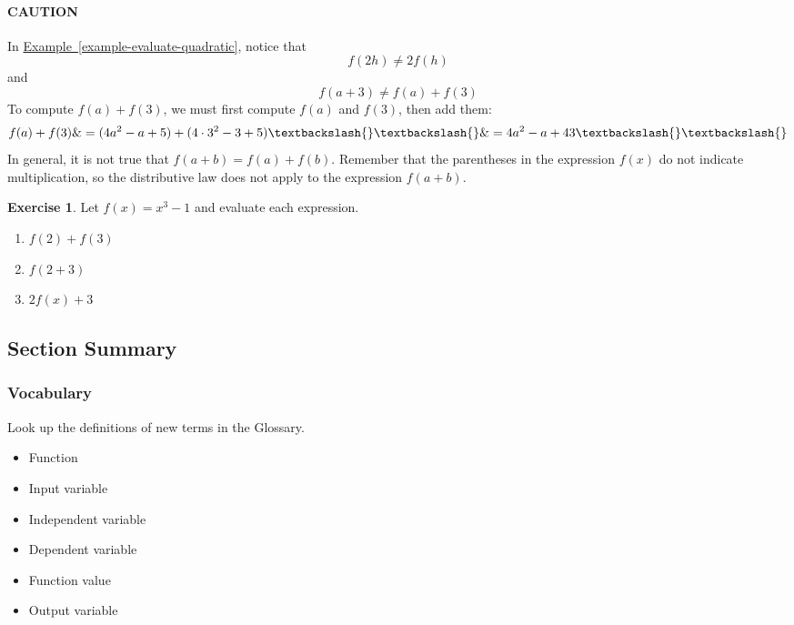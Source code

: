 \documentclass[10pt,]{book}
\theoremstyle{plain}
\theoremstyle{definition}
\theoremstyle{definition}
\theoremstyle{definition}
\theoremstyle{definition}
\newtheorem{exercise}[theorem]{Exercise}
\numberwithin{equation}{part}
\begin{document}
\paragraph[{CAUTION}]{CAUTION}\hypertarget{paragraphs-2}{}
In \hyperref[example-evaluate-quadratic]{Example~\ref{example-evaluate-quadratic}}, notice that%
\begin{equation*}
f(2h) \ne 2 f(h)
\end{equation*}
and%
\begin{equation*}
f(a + 3) \ne f(a) + f(3)
\end{equation*}
To compute \(f(a) + f(3)\), we must first compute \(f(a)\) and \(f(3)\), then add them: \begin{align*} f(a)+f(3)\&= (4a^2-a+5)+(4\cdot 3^2-3+5) \textbackslash{}\textbackslash{} \&= 4a^2 - a + 43\textbackslash{}\textbackslash{} \end{align*} In general, it is not true that \(f(a + b) = f(a) + f(b)\). Remember that the parentheses in the expression \(f(x)\) do not indicate multiplication, so the distributive law does not apply to the expression \(f(a + b)\).%
\begin{exercise}\label{exercise-function-notation2}
Let \(f(x) = x^3 - 1\) and evaluate each expression. \leavevmode%
\begin{enumerate}[label=\alph*]
\item\hypertarget{li-315}{}\(f(2) + f(3)\)%
\item\hypertarget{li-316}{}\(f(2 + 3)\)%
\item\hypertarget{li-317}{}\(2 f(x) + 3\)%
\end{enumerate}
\end{exercise}
\typeout{************************************************}
\typeout{************************************************}
\subsection[{Section Summary}]{Section Summary}\label{summary-1-2}
\typeout{************************************************}
\typeout{************************************************}
\subsubsection[{Vocabulary}]{Vocabulary}\label{subsubsection-5}
Look up the definitions of new terms in the Glossary. \leavevmode%
\begin{multicols}{3}
\begin{itemize}[label=\textbullet]
\item{}Function%
\item{}Input variable%
\item{}Independent variable%
\item{}Dependent variable%
\item{}Function value%
\item{}Output variable%
\end{itemize}
\end{multicols}
%
\typeout{************************************************}
\typeout{************************************************}
\end{document}
